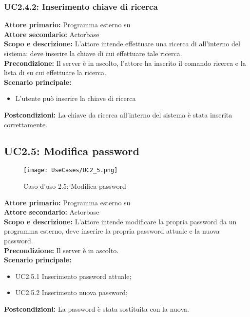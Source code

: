 \documentclass{scalatekids-article}
\begin{document}
\subsubsection{UC2.4.2: Inserimento chiave di ricerca}

\textbf{Attore primario:} Programma esterno su \\
\textbf{Attore secondario:} Actorbase\\
\textbf{Scopo e descrizione:} L'attore intende effettuare una ricerca di  all'interno del sistema; deve inserire la chiave di cui effettuare tale ricerca.\\
\textbf{Precondizione:} Il server è in ascolto, l'attore ha inserito il comando ricerca e la lista di  su cui effettuare la ricerca.\\
\textbf{Scenario principale:}
\begin{itemize}
\item L'utente può inserire la chiave di ricerca
\end{itemize}
\textbf{Postcondizioni:} La chiave da ricerca all'interno del sistema è stata inserita correttamente.

\subsection{UC2.5: Modifica password}

\begin{figure}[H]
  \begin{center}
    \texttt{[image: UseCases/UC2\_5.png]}
    \caption{Caso d'uso 2.5: Modifica password}
  \end{center}
\end{figure}
\textbf{Attore primario:} Programma esterno su \\
\textbf{Attore secondario:} Actorbase\\
\textbf{Scopo e descrizione:} L'attore intende modificare la propria password da un programma  esterno, deve inserire la propria password attuale e la nuova password.\\
\textbf{Precondizione:} Il server è in ascolto.\\
\textbf{Scenario principale:}
\begin{itemize}
\item UC2.5.1 Inserimento password attuale;
\item UC2.5.2 Inserimento nuova password;
\end{itemize}
\textbf{Postcondizioni:} La password è stata sostituita con la nuova.
\end{document}
